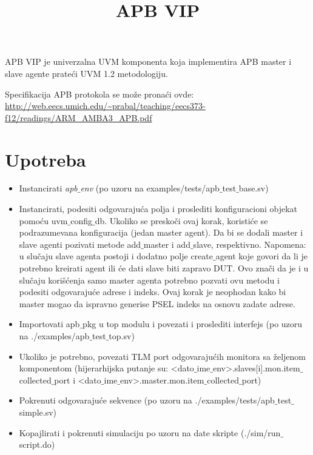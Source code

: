 \documentclass{article}
\title{
  \textmd{\textbf{APB VIP}}
}
\author{}
\date{}
\begin{document}
\maketitle

APB VIP je univerzalna UVM komponenta koja implementira APB master i slave
agente prateći UVM 1.2 metodologiju.

Specifikacija APB protokola se može pronaći ovde:
\url{http://web.eecs.umich.edu/~prabal/teaching/eecs373-f12/readings/ARM_AMBA3_APB.pdf}

\section{Upotreba}

\begin{itemize}
\item Instancirati \emph{apb\(\_\)env} (po uzoru na
  examples/tests/apb\(\_\)test\(\_\)base.sv)
\item Instancirati, podesiti odgovarajuća polja i proslediti konfiguracioni
  objekat pomoću uvm\(\_\)config\(\_\)db. Ukoliko se preskoči ovaj korak,
  koristiće se podrazumevana konfiguracija (jedan master agent). Da bi se dodali
  master i slave agenti pozivati metode add\(\_\)master i add\(\_\)slave,
  respektivno.
  Napomena: u slučaju slave agenta postoji i dodatno polje create\(\_\)agent
  koje govori da li je potrebno kreirati agent ili će dati slave biti zapravo
  DUT. Ovo znači da je i u slučaju korišćenja samo master agenta potrebno
  pozvati ovu metodu i podesiti odgovarajuće adrese i indeks. Ovaj korak je
  neophodan kako bi master mogao da ispravno generise PSEL indeks na osnovu
  zadate adrese.
\item Importovati apb\(\_\)pkg u top modulu i povezati i proslediti interfejs
  (po uzoru na ./examples/apb\(\_\)test\(\_\)top.sv)
\item Ukoliko je potrebno, povezati TLM port odgovarajućih monitora sa željenom
  komponentom (hijerarhijska putanje su:
  <dato\(\_\)ime\(\_\)env>.slaves[i].mon.item\(\_\)collected\(\_\)port i
  <dato\(\_\)ime\(\_\)env>.master.mon.item\(\_\)collected\(\_\)port)
\item Pokrenuti odgovarajuće sekvence (po uzoru na
  ./examples/tests/apb\(\_\)test\(\_\)simple.sv)
\item Kopajlirati i pokrenuti simulaciju po uzoru na date skripte (./sim/run\(\_\)script.do)
\end{itemize}
\end{document}
